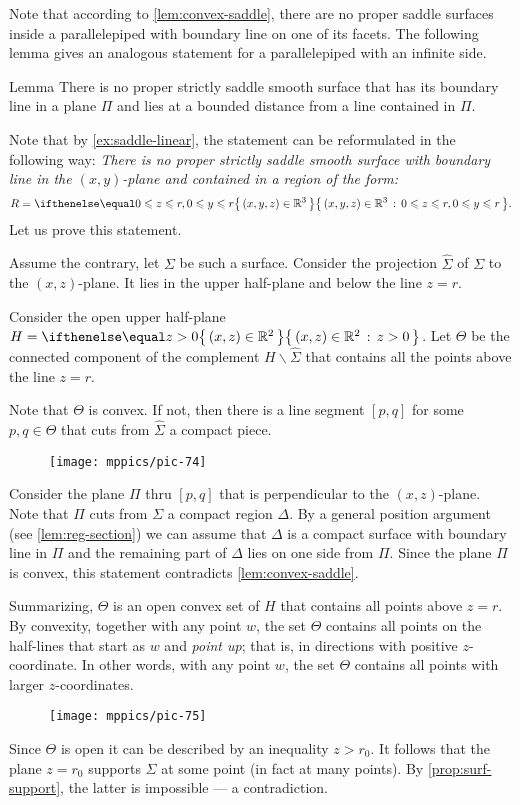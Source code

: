 Note that according to \ref{lem:convex-saddle}, there are no proper saddle surfaces inside  a parallelepiped with boundary line on one of its facets.
The following lemma gives an analogous statement for a parallelepiped with an infinite side.

\begin{thm}{Lemma}\label{lem:region}
There is no proper strictly saddle smooth surface that has its boundary line in a plane $\Pi$ 
and lies at a bounded distance from a line contained in $\Pi$.
\end{thm}


Note that by \ref{ex:saddle-linear}, the statement can be reformulated in the following way:
\emph{There is no proper strictly saddle smooth surface 
with  boundary line in the $(x,y)$-plane
and contained in a region of the form:}
\[R=\set{(x,y,z)\in\mathbb{R}^3}{0\le z\le r, 0\le y\le r}.\]
Let us prove this statement.

Assume the contrary, let $\Sigma$ be such a surface.
Consider the projection $\hat \Sigma$ of $\Sigma$ to the $(x,z)$-plane.
It lies in the upper half-plane and below the line $z=r$.

Consider the open upper half-plane $H=\set{(x,z)\in \mathbb{R}^2}{z> 0}$. 
Let $\Theta$ be the connected component of the complement $H\backslash \hat \Sigma$ that contains all the points above the line $z=r$.

Note that $\Theta$ is convex.
If not, then there is a line segment $[p,q]$ for some $p,q\in \Theta$ that cuts from $\hat\Sigma$ a compact piece.
\begin{figure}[h!]
\vskip-0mm
\centering
\texttt{[image: mppics/pic-74]}
\vskip0mm
\end{figure}
Consider the plane $\Pi$ thru $[p,q]$ that is perpendicular to the $(x,z)$-plane.
Note that $\Pi$ cuts from $\Sigma$ a compact region $\Delta$.
By a general position argument (see \ref{lem:reg-section}) 
we can assume that $\Delta$ is a compact surface with boundary line in $\Pi$ and the remaining part of $\Delta$ lies on one side from $\Pi$.
Since the plane $\Pi$ is convex, this statement contradicts \ref{lem:convex-saddle}.

Summarizing, $\Theta$ is an open convex set of $H$ that contains all points above $z=r$.
By convexity, together with any point $w$, the set $\Theta$ contains all points on the half-lines that start as $w$ and {}\emph{point up}; that is, in directions with positive $z$-coordinate. 
In other words, with any point $w$,
the set $\Theta$ contains all points with larger $z$-coordinates.
\begin{figure}[h!]
\vskip-0mm
\centering
\texttt{[image: mppics/pic-75]}
\vskip0mm
\end{figure}
Since $\Theta$ is open it can be described by an inequality $z>r_0$.
It follows that the plane $z=r_0$ supports $\Sigma$ at some point (in fact at many points).
By \ref{prop:surf-support}, the latter is impossible --- a contradiction.
\qeds

